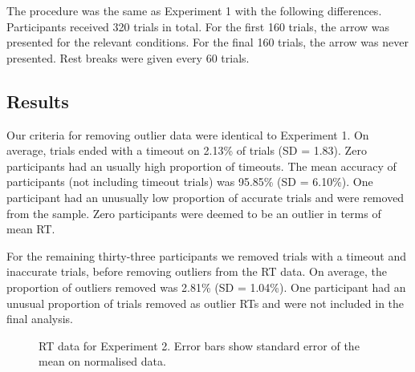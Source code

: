 \documentclass[
  man,
  floatsintext,
  longtable,
  nolmodern,
  notxfonts,
  notimes,
  colorlinks=true,linkcolor=blue,citecolor=blue,urlcolor=blue]{apa7}
\begin{document}
The procedure was the same as Experiment 1 with the following
differences. Participants received 320 trials in total. For the first
160 trials, the arrow was presented for the relevant conditions. For the
final 160 trials, the arrow was never presented. Rest breaks were given
every 60 trials.

\subsection{Results}\label{results-1}

Our criteria for removing outlier data were identical to Experiment 1.
On average, trials ended with a timeout on 2.13\% of trials (SD = 1.83).
Zero participants had an usually high proportion of timeouts. The mean
accuracy of participants (not including timeout trials) was 95.85\% (SD
= 6.10\%). One participant had an unusually low proportion of accurate
trials and were removed from the sample. Zero participants were deemed
to be an outlier in terms of mean RT.

For the remaining thirty-three participants we removed trials with a
timeout and inaccurate trials, before removing outliers from the RT
data. On average, the proportion of outliers removed was 2.81\% (SD =
1.04\%). One participant had an unusual proportion of trials removed as
outlier RTs and were not included in the final analysis.

\begin{figure}[H]


\caption{\label{fig-RT-exp2}RT data for Experiment 2. Error bars show
standard error of the mean on normalised data.}

\end{figure}%
\end{document}
